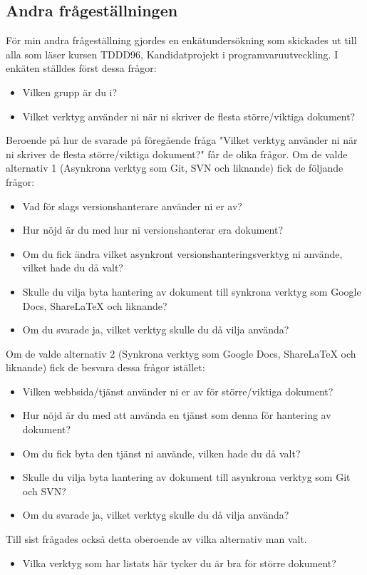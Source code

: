 \subsection{Andra frågeställningen}
För min andra frågeställning gjordes en enkätundersökning som skickades ut till alla som läser kursen TDDD96, Kandidatprojekt i programvaruutveckling. I enkäten ställdes först dessa frågor:
\begin{itemize}
	\item Vilken grupp är du i?
	\item Vilket verktyg använder ni när ni skriver de flesta större/viktiga dokument?
\end{itemize}
Beroende på hur de svarade på föregående fråga "Vilket verktyg använder ni när ni skriver de flesta större/viktiga dokument?" får de olika frågor. Om de valde alternativ 1 (Asynkrona verktyg som Git, SVN och liknande) fick de följande frågor:
\begin{itemize}
	\item Vad för slags versionshanterare använder ni er av?
	\item Hur nöjd är du med hur ni versionshanterar era dokument?
	\item Om du fick ändra vilket asynkront versionshanteringsverktyg ni använde, vilket hade du då valt?
	\item Skulle du vilja byta hantering av dokument till synkrona verktyg som Google Docs, ShareLaTeX och liknande?
	\item Om du svarade ja, vilket verktyg skulle du då vilja använda?
\end{itemize}
Om de valde alternativ 2 (Synkrona verktyg som Google Docs, ShareLaTeX och liknande) fick de besvara dessa frågor istället:
\begin{itemize}
	\item Vilken webbsida/tjänst använder ni er av för större/viktiga dokument?
	\item Hur nöjd är du med att använda en tjänst som denna för hantering av dokument?
	\item Om du fick byta den tjänst ni använde, vilken hade du då valt?
	\item Skulle du vilja byta hantering av dokument till asynkrona verktyg som Git och SVN?
	\item Om du svarade ja, vilket verktyg skulle du då vilja använda?
\end{itemize}
Till sist frågades också detta oberoende av vilka alternativ man valt.
\begin{itemize}
	\item Vilka verktyg som har listats här tycker du är bra för större dokument?
\end{itemize}

